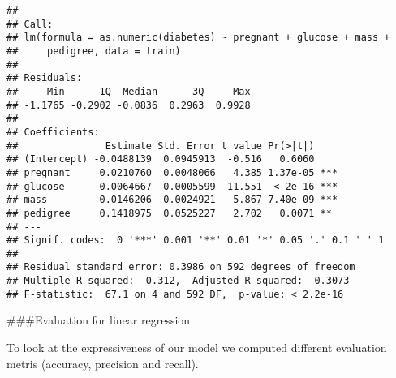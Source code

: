 \documentclass[
]{article}
\begin{document}
\begin{verbatim}
## 
## Call:
## lm(formula = as.numeric(diabetes) ~ pregnant + glucose + mass + 
##     pedigree, data = train)
## 
## Residuals:
##     Min      1Q  Median      3Q     Max 
## -1.1765 -0.2902 -0.0836  0.2963  0.9928 
## 
## Coefficients:
##               Estimate Std. Error t value Pr(>|t|)    
## (Intercept) -0.0488139  0.0945913  -0.516   0.6060    
## pregnant     0.0210760  0.0048066   4.385 1.37e-05 ***
## glucose      0.0064667  0.0005599  11.551  < 2e-16 ***
## mass         0.0146206  0.0024921   5.867 7.40e-09 ***
## pedigree     0.1418975  0.0525227   2.702   0.0071 ** 
## ---
## Signif. codes:  0 '***' 0.001 '**' 0.01 '*' 0.05 '.' 0.1 ' ' 1
## 
## Residual standard error: 0.3986 on 592 degrees of freedom
## Multiple R-squared:  0.312,  Adjusted R-squared:  0.3073 
## F-statistic:  67.1 on 4 and 592 DF,  p-value: < 2.2e-16
\end{verbatim}

\#\#\#Evaluation for linear regression

To look at the expressiveness of our model we computed different
evaluation metris (accuracy, precision and recall).
\end{document}

